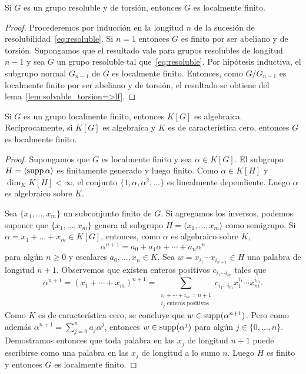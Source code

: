 \begin{proposition}
	Si $G$ es un grupo resoluble y de torsión, entonces $G$ es localmente
	finito.
\end{proposition}

\begin{proof}
	Procederemos por inducción en la longitud $n$ de la sucesión de
	resolubilidad~\eqref{eq:resoluble}. Si $n=1$ entonces $G$ es finito por ser
	abeliano y de torsión. Supongamos que el resultado vale para grupos
	resolubles de longitud $n-1$ y sea $G$ un grupo resoluble tal
	que~\eqref{eq:resoluble}. Por hipótesis inductiva, el subgrupo normal
	$G_{n-1}$ de $G$ es localmente finito. Entonces, como $G/G_{n-1}$ es
	localmente finito por ser abeliano y de torsión, el resultado se obtiene
	del lema~\ref{lem:solvable_torsion=>lf}.
\end{proof}

\begin{theorem}[Herstein]
	Si $G$ es un grupo localmente finito, entonces $K[G]$ es algebraica.
	Recíprocamente, si $K[G]$ es algebraica y $K$ es de característica cero,
	entonces $G$ es localmente finito.
\end{theorem}

\begin{proof}
	Supongamos que $G$ es localmente finito y sea $\alpha\in K[G]$. El subgrupo
	$H=\langle\operatorname{supp}\alpha\rangle$ es finitamente generado y luego finito. Como
	$\alpha\in K[H]$ y $\dim_KK[H]<\infty$, el conjunto
	$\{1,\alpha,\alpha^2,\dots\}$ es linealmente dependiente. Luego $\alpha$ es
	algebraico sobre $K$.

	Sea $\{x_1,\dots,x_m\}$ un subconjunto finito de $G$. Si agregamos los
	inversos, podemos suponer que $\{x_1,\dots,x_m\}$ genera al subgrupo
	$H=\langle x_1,\dots,x_m\rangle$ como semigrupo. Si
	$\alpha=x_1+\dots+x_m\in K[G]$, entonces, como $\alpha$ es algebraico sobre
	$K$, 
	\[
		\alpha^{n+1}=a_0+a_1\alpha+\cdots+a_n\alpha^n
	\]
	para algún $n\geq0$ y escalares $a_0,\dots,x_n\in K$. Sea $w=x_{i_1}\cdots
	x_{i_{n+1}}\in H$ una palabra de longitud $n+1$. Observemos que existen enteros
	positivos $c_{i_1\cdots i_m}$ tales que 
	\[
		\alpha^{n+1}=(x_1+\cdots+x_m)^{n+1}
		=\sum_{\substack{{i_1+\cdots+i_m=n+1}\\{\text{$i_j$ enteros positivos}}}} c_{i_1\cdots i_m}x_1^{i_1}\cdots x_{m}^{i_m}.
	\]
	Como $K$
	es de característica cero, se concluye que $w\in\operatorname{supp}(\alpha^{n+1})$.  Pero
	como además $\alpha^{n+1}=\sum_{j=0}^na_j\alpha^j$, entonces
	$w\in\operatorname{supp}(\alpha^j)$ para algún $j\in\{0,\dots,n\}$. Demostramos entonces
	que toda palabra en las $x_j$ de longitud $n+1$ puede escribirse como una
	palabra en las $x_j$ de longitud a lo sumo $n$.  Luego $H$ es finito y
	entonces $G$ es localmente finito.
\end{proof}

